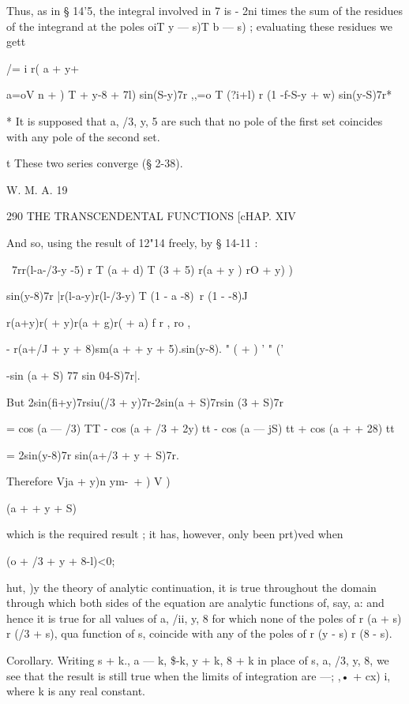 Thus, as in § 14'5, the integral involved in 7 is - 2ni times the sum
of the residues of the integrand at the poles oiT y — s)T b — s) ;
evaluating these residues we gett

/= i r( a + y+%



a=oV n + ) T + y-8 + 7l) sin(S-y)7r ,,=o T (?i+l) r (1 -f-S-y + w)
sin(y-S)7r*

* It is supposed that a, /3, y, 5 are such that no pole of the first
set coincides with any pole of the second set.

t These two series converge (§ 2-38).

W. M. A. 19



290 THE TRANSCENDENTAL FUNCTIONS [cHAP. XIV

And so, using the result of 12"14 freely, by § 14-11 :

\ 7rr(l-a-/3-y -5) r T (a + d) T (3 + 5) r(a + y ) rO + y) )

sin(y-8)7r |r(l-a-y)r(l-/3-y) T (1 - a -8)~r (1 - -8)J

r(a+y)r( + y)r(a + g)r( + a) f r , ro ,

- r(a+/J + y + 8)sm(a + + y + 5).sin(y-8). " ( + ) ' " ('

-sin (a + S) 77 sin 04-S)7r|.

But 2sin(fi+y)7rsiu(/3 + y)7r-2sin(a + S)7rsin (3 + S)7r

= cos (a — /3) TT - cos (a + /3 + 2y) tt - cos (a — jS) tt + cos (a +
+ 28) tt

= 2sin(y-8)7r sin(a+/3 + y + S)7r.

Therefore Vja + y)n ym-\ + ) V )

 (a + + y + S)

which is the required result ; it has, however, only been prt)ved when

 (o + /3 + y + 8-l)<0;

hut, )y the theory of analytic continuation, it is true throughout the
domain through which both sides of the equation are analytic functions
of, say, a: and hence it is true for all values of a, /ii, y, 8 for
which none of the poles of r (a + s) r (/3 + s), qua function of s,
coincide with any of the poles of r (y - s) r (8 - s).

Corollary. Writing s + k., a — k, \$-k, y + k, 8 + k in place of s, a,
/3, y, 8, we see that the result is still true when the limits of
integration are —; ,• + cx) i, where k is any real constant.

